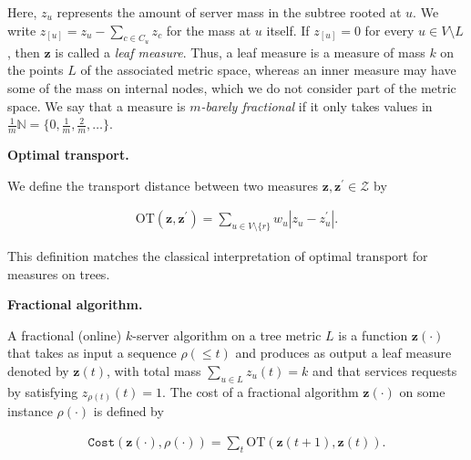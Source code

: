 Here, $z_{u}$ represents the amount of server mass in the subtree rooted at $u$. We write $z_{[u]}=z_{u}-\sum_{c\in C_{u}}z_{c}$ for the mass at $u$ itself. If $z_{[u]}=0$ for every $u\in V\setminus L$, then ${\mathbf{z}}$ is called a \emph{leaf measure}. Thus, a leaf measure is a measure of mass $k$ on the points $L$ of the associated metric space, whereas an inner measure may have some of the mass on internal nodes, which we do not consider part of the metric space. We say that a measure is \emph{$m$-barely fractional} if it only takes values in $\frac{1}{m}\mathbb{N}=\{0,\frac{1}{m},\frac{2}{m},\dots\}$.\par





\par\medskip\noindent\textbf{Optimal transport.}\par




We define the transport distance between two measures ${\mathbf{z}},{\mathbf{z}}^{\prime}\in\mathcal{Z}$ by\par


\[\begin{gathered}
\text{OT}({\mathbf{z}},{\mathbf{z}}^{\prime})=\sum_{u\in V\setminus\{r\}}w_{u}|z_{u}-z_{u}^{\prime}|.
\end{gathered}\]


This definition matches the classical interpretation of optimal transport for measures on trees.\par





\par\medskip\noindent\textbf{Fractional algorithm.}\par




A fractional (online) $k$-server algorithm on a tree metric $L$ is a function ${\mathbf{z}}(\cdot)$ that takes as input a sequence $\rho(\leq t)$ and produces as output a leaf measure denoted by ${\mathbf{z}}(t)$, with total mass $\sum_{u\in L}z_{u}(t)=k$ and that services requests by satisfying $z_{\rho(t)}(t)=1$. The cost of a fractional algorithm ${\mathbf{z}}(\cdot)$ on some instance $\rho(\cdot)$ is defined by\par


\[\begin{gathered}
{\texttt{Cost}}({\mathbf{z}}(\cdot),\rho(\cdot))=\sum_{t}\text{OT}({\mathbf{z}}(t+1),{\mathbf{z}}(t)).
\end{gathered}\]



